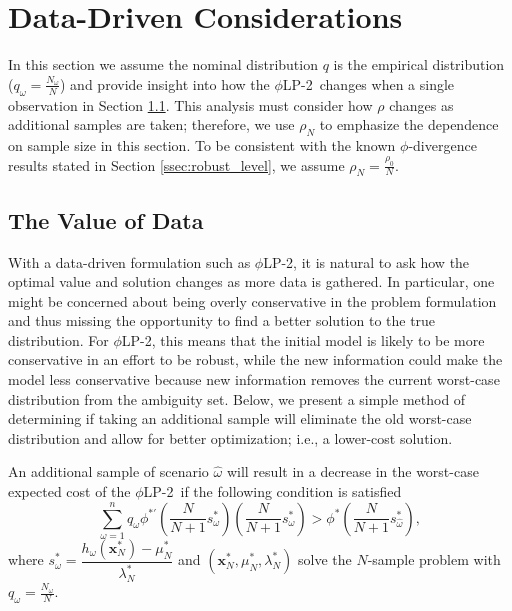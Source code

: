 \documentclass[opre,nonblindrev]{informs3} %
\newcommand{\x}{\mathbf{x}}
\newcommand{\plp}{$\phi$LP-2}
\begin{document}
\section{Data-Driven Considerations}
\label{sec:properties}

In this section we assume the nominal distribution $q$ is the empirical distribution ($q_\omega = \tfrac{N_\omega}{N}$) and provide insight into how the \plp\ changes when a single observation in Section \ref{ssec:value}.
This analysis must consider how $\rho$ changes as additional samples are taken; therefore, we use $\rho_N$ to emphasize the dependence on sample size in this section.
To be consistent with the known $\phi$-divergence results stated in Section \ref{ssec:robust_level}, we assume $\rho_N = \frac{\rho_0}{N}$.

\subsection{The Value of Data} \label{ssec:value}

With a data-driven formulation such as \plp, it is natural to ask how the optimal value and solution changes as more data is gathered.
In particular, one might be concerned about being overly conservative in the problem formulation and thus missing the opportunity to find a better solution to the true distribution.
For \plp, this means that the initial model is likely to be more conservative in an effort to be robust, while the new information could make the model less conservative because new information removes the current worst-case distribution from the ambiguity set.  
Below, we present a simple method of determining if taking an additional sample will eliminate the old worst-case distribution and allow for better optimization; i.e., a lower-cost solution.

\begin{theorem}
	\label{thm:value}
	An additional sample of scenario $\hat{\omega}$ will result in a decrease in the worst-case expected cost of the \plp\ if the following condition is satisfied
	\begin{equation} \label{eq:cost_decrease_cond}
		\sum_{\omega=1}^n q_\omega \phi^{*\prime}\left(\frac{N}{N+1}s^*_\omega\right) \left(\frac{N}{N+1}s^*_\omega\right) > \phi^*\left(\frac{N}{N+1}s^*_{\hat{\omega}}\right),
	\end{equation}
	where $s^*_\omega = \dfrac{h_\omega(\x^*_N) - \mu^*_N}{\lambda^*_N}$ and $(\x^*_N,\mu^*_N,\lambda^*_N)$ solve the $N$-sample problem with $q_\omega = \tfrac{N_\omega}{N}$.
\end{theorem}
\end{document}
